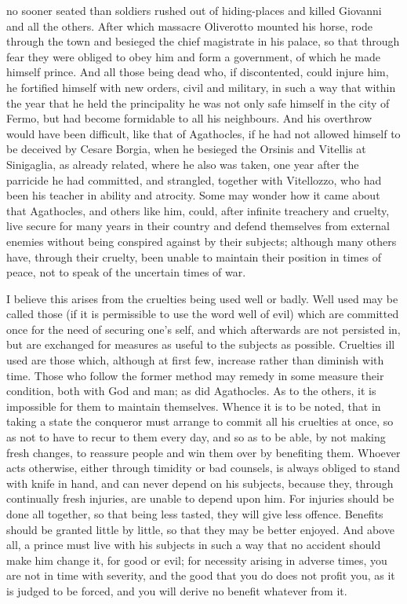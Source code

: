 \documentclass[12pt,letterpaper]{memoir}
\begin{document}
no sooner seated than soldiers rushed out of hiding-places and killed
Giovanni and all the others. After which massacre Oliverotto mounted
his horse, rode through the town and besieged the chief magistrate in
his palace, so that through fear they were obliged to obey him and form
a government, of which he made himself prince. And all those being
dead who, if discontented, could injure him, he fortified himself
with new orders, civil and military, in such a way that within the
year that he held the principality he was not only safe himself in
the city of Fermo, but had become formidable to all his neighbours.
And his overthrow would have been difficult, like that of Agathocles,
if he had not allowed himself to be deceived by Cesare Borgia, when
he besieged the Orsinis and Vitellis at Sinigaglia, as already
related, where he also was taken, one year after the parricide he had
committed, and strangled, together with Vitellozzo, who had been his
teacher in ability and atrocity. Some may wonder how it came about
that Agathocles, and others like him, could, after infinite treachery
and cruelty, live secure for many years in their country and defend
themselves from external enemies without being conspired against by
their subjects; although many others have, through their cruelty, been
unable to maintain their position in times of peace, not to speak of
the uncertain times of war.

I believe this arises from the cruelties being used well or badly.
Well used may be called those (if it is permissible to use the word
well of evil) which are committed once for the need of securing one's
self, and which afterwards are not persisted in, but are exchanged for
measures as useful to the subjects as possible. Cruelties ill used
are those which, although at first few, increase rather than diminish
with time. Those who follow the former method may remedy in some
measure their condition, both with God and man; as did Agathocles.
As to the others, it is impossible for them to maintain themselves.
Whence it is to be noted, that in taking a state the conqueror must
arrange to commit all his cruelties at once, so as not to have to recur
to them every day, and so as to be able, by not making fresh changes,
to reassure people and win them over by benefiting them. Whoever acts
otherwise, either through timidity or bad counsels, is always obliged
to stand with knife in hand, and can never depend on his subjects,
because they, through continually fresh injuries, are unable to depend
upon him. For injuries should be done all together, so that being less
tasted, they will give less offence. Benefits should be granted little
by little, so that they may be better enjoyed. And above all, a prince
must live with his subjects in such a way that no accident should make
him change it, for good or evil; for necessity arising in adverse
times, you are not in time with severity, and the good that you do does
not profit you, as it is judged to be forced, and you will derive no
benefit whatever from it.
\end{document}
